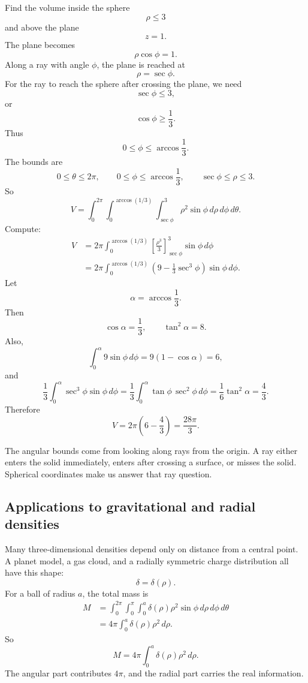 \begin{example}
Find the volume inside the sphere
\[
    \rho\le3
\]
and above the plane
\[
    z=1.
\]
The plane becomes
\[
    \rho\cos\phi=1.
\]
Along a ray with angle \(\phi\), the plane is reached at
\[
    \rho=\sec\phi.
\]
For the ray to reach the sphere after crossing the plane, we need
\[
    \sec\phi\le3,
\]
or
\[
    \cos\phi\ge\frac13.
\]
Thus
\[
    0\le\phi\le\arccos\frac13.
\]
The bounds are
\[
    0\le\theta\le2\pi,
    \qquad
    0\le\phi\le\arccos\frac13,
    \qquad
    \sec\phi\le\rho\le3.
\]
So
\[
\boxed{
V=
\int_0^{2\pi}
\int_0^{\arccos(1/3)}
\int_{\sec\phi}^{3}
\rho^2\sin\phi\,d\rho\,d\phi\,d\theta.
}
\]
Compute:
\[
\begin{aligned}
V
&=
2\pi\int_0^{\arccos(1/3)}
\left[\frac{\rho^3}{3}\right]_{\sec\phi}^3
\sin\phi\,d\phi\\
&=
2\pi\int_0^{\arccos(1/3)}
\left(9-\frac13\sec^3\phi\right)\sin\phi\,d\phi.
\end{aligned}
\]
Let
\[
    \alpha=\arccos\frac13.
\]
Then
\[
    \cos\alpha=\frac13,
    \qquad
    \tan^2\alpha=8.
\]
Also,
\[
    \int_0^\alpha 9\sin\phi\,d\phi
    =
    9(1-\cos\alpha)=6,
\]
and
\[
    \frac13\int_0^\alpha \sec^3\phi\sin\phi\,d\phi
    =
    \frac13\int_0^\alpha \tan\phi\,\sec^2\phi\,d\phi
    =
    \frac16\tan^2\alpha
    =
    \frac43.
\]
Therefore
\[
    V=2\pi\left(6-\frac43\right)=\frac{28\pi}{3}.
\]
\end{example}

The angular bounds come from looking along rays from the origin.  A ray either enters
the solid immediately, enters after crossing a surface, or misses the solid.  Spherical
coordinates make us answer that ray question.

\subsection{Applications to gravitational and radial densities}

Many three-dimensional densities depend only on distance from a central point.  A
planet model, a gas cloud, and a radially symmetric charge distribution all have this
shape:
\[
    \delta=\delta(\rho).
\]
For a ball of radius \(a\), the total mass is
\[
\begin{aligned}
M
&=
\int_0^{2\pi}\int_0^\pi\int_0^a
\delta(\rho)\rho^2\sin\phi\,d\rho\,d\phi\,d\theta\\
&=
4\pi\int_0^a \delta(\rho)\rho^2\,d\rho.
\end{aligned}
\]
So
\[
\boxed{
    M=4\pi\int_0^a \delta(\rho)\rho^2\,d\rho.
}
\]
The angular part contributes \(4\pi\), and the radial part carries the real information.

